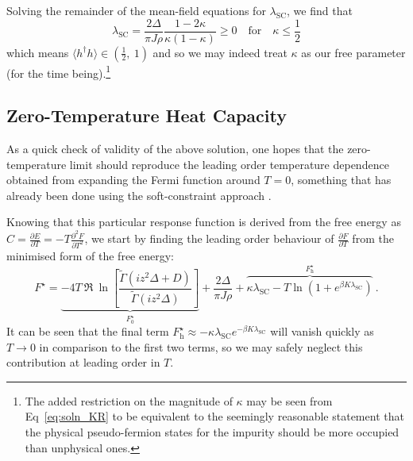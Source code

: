 Solving the remainder of the mean-field equations for $ \lambda_{\text{SC}} $, we find that
\begin{equation}
\lambda_{\text{SC}} = \frac{2 \Delta}{\pi J \rho} \frac{1 - 2 \kappa}{\kappa (1 - \kappa)} \geq 0 \quad \text{for} \quad \kappa \leq \frac{1}{2}
\label{eq:soln_lambda_SC}
\end{equation} which means $ \langle h^{\dagger} h \rangle \in \left(\frac{1}{2}, ~ 1\right) $ and so we may indeed treat $ \kappa $ as our free parameter (for the time being).\footnote{The added restriction on the magnitude of $ \kappa $ may be seen from Eq~\eqref{eq:soln_KR} to be equivalent to the seemingly reasonable statement that the physical pseudo-fermion states for the impurity should be more occupied than unphysical ones.}

\subsection{Zero-Temperature Heat Capacity}

As a quick check of validity of the above solution, one hopes that the zero-temperature limit should reproduce the leading order temperature dependence obtained from expanding the Fermi function around $ T = 0 $, something that has already been done using the soft-constraint approach \cite{Draft}.

Knowing that this particular response function is derived from the free energy as $ C = \frac{\partial E}{\partial T} = - T \frac{\partial^{2} F}{\partial T ^2} $, we start by finding the leading order behaviour of $ \frac{\partial F}{\partial T} $ from the minimised form of the free energy:
\begin{equation}
F^{\star} = \underbrace{- 4 T ~ \Re{ ~ \ln{\left[ \frac{\widetilde{\Gamma}(i z^2 \Delta + D)}{\widetilde{\Gamma}(i z^2 \Delta)} \right]}}}_{F_0^{\star}} + \frac{2 \Delta}{\pi J \rho} + \overbrace{\kappa \lambda_{\text{SC}}  - T \ln{\left( 1 + e^{\beta K \lambda_{\text{SC}}} \right)}}^{F_{\text{h}}^{\star}} ~ .
\end{equation}
It can be seen that the final term $ F_{\text{h}}^{\star} \approx - \kappa \lambda_{\text{SC}} e^{- \beta K \lambda_{\text{SC}}} $ will vanish quickly as $ T \rightarrow 0 $ in comparison to the first two terms, so we may safely neglect this contribution at leading order in $ T $.

